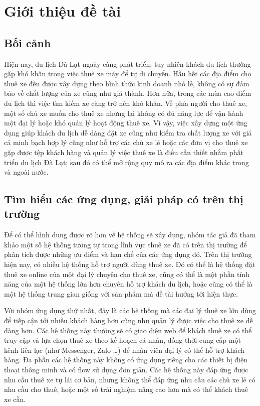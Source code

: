 \documentclass[../main.tex]{subfiles}
\begin{document}
	\justifying


	\chapter{Giới thiệu đề tài}
	\label{chap:intro}


	\section{Bối cảnh}

	Hiện nay, du lịch Đà Lạt ngaày càng phát triển; tuy nhiên khách du lịch thường gặp khó khăn trong việc thuê xe máy
	để tự di chuyển. Hầu hết các địa điểm cho thuê xe đều được xây dựng theo hình thức kinh doanh nhỏ lẻ, không có sự
	đảm bảo về chất lượng của xe cũng như giá thành. Hơn nữa, trong các mùa cao điểm du lịch thì việc tìm kiếm xe càng
	trở nên khó khăn. Về phía người cho thuê xe, một số chủ xe muốn cho thuê xe nhưng lại không có đủ năng lực để vận
	hành một đại lý hoặc khó quản lý hoạt động thuê xe. Vì vậy, việc xây dựng một ứng dụng giúp khách du lịch dễ dàng
	đặt xe cũng như kiểm tra chất lượng xe với giá cả minh bạch hợp lý cũng như hỗ trợ các chủ xe lẻ hoặc các đơn vị
	cho thuê xe gặp được tệp khách hàng và quản lý việc thuê xe là điều cần thiết nhằm phất triển du lịch Đà Lạt; sau
	đó có thể mở rộng quy mô ra các địa điểm khác trong và ngoài nước.


	\section{Tìm hiểu các ứng dụng, giải pháp có trên thị trường}

	Để có thể hình dung được rõ hơn về hệ thống sẽ xây dụng, nhóm tác giả đã tham khảo một số hệ thống tương tự trong
	lĩnh vực thuê xe đã có trên thị trường để phân tích được những ưu điểm và hạn chế của các ứng dụng đó. Trên thị
	trường hiện nay, có nhiều hệ thống hỗ trợ người dùng thuê xe. Đó có thể là hệ thống đặt thuê xe online của một đại
	lý chuyên cho thuê xe, cũng có thể là một phần tính năng của một hệ thống lớn hơn chuyên hỗ trợ khách du lịch,
	hoặc cũng có thể là một hệ thống trung gian giống với sản phẩm mà đề tài hướng tới hiện thực.

	Với nhóm ứng dụng thứ nhất, đây là các hệ thống mà các đại lý thuê xe lớn dùng để tiếp cận tới nhiều khách hàng
	hơn cũng như quản lý được việc cho thuê xe dễ dàng hơn. Các hệ thống này thường sẽ có giao diện web để khách thuê
	xe có thể truy cập và lựa chọn thuê xe theo kế hoạch cá nhân, đồng thời cung cấp một kênh liên lạc (như Messenger,
	Zalo \ldots) để nhân viên đại lý có thể hỗ trợ khách hàng. Đa phần các hệ thống này không có ứng dụng riêng cho các
	thiết bị điện thoại thông minh và có flow sử dụng đơn giản. Các hệ thống này đáp ứng được nhu cầu thuê xe tự lái cơ
	bản, nhưng không thể đáp ứng nhu cầu các chủ xe lẻ có nhu cầu cho thuê, hoặc một số trải nghiệm nâng cao hơn mà có
	thể khách thuê xe cần.
\end{document}
